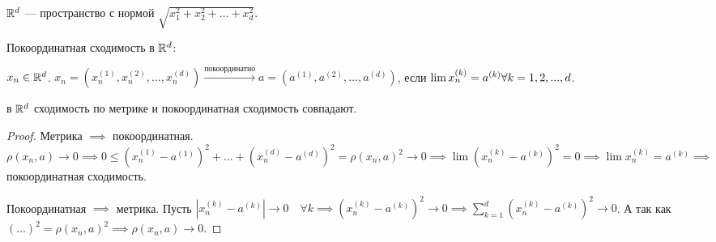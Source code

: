 \begin{definition}
    $\mathbb{R}^d$ --- пространство с нормой  $\sqrt{x_1^2 + x_2^2 + \ldots + x_d^2}$.
\end{definition}
\begin{definition}
    Покоординатная сходимость в $\mathbb{R}^d$:

    $x_n \in \mathbb{R}^d$.  $x_n = (x_n^{(1)}, x_n^{(2)}, \ldots, x_n^{(d)}) \xrightarrow{\text{покоординатно}} a = (a^{(1)}, a^{(2)}, \ldots, a^{(d)})$, если $\lim x_n^{(k)} = a^{(k)}\\ \forall k = 1, 2, ..., d$.
\end{definition}
\begin{theorem}
    в $\mathbb{R}^d$ сходимость по метрике и покоординатная сходимость совпадают.
\end{theorem}
\begin{proof}
    Метрика $\implies$ покоординатная.  $\rho(x_n, a) \to 0 \implies 0 \le (x_n^{(1)} - a^{(1)})^2 + \ldots + (x_n^{(d)} - a^{(d)})^2 = \rho(x_n, a)^2 \to 0 \implies \lim (x_n^{(k)} - a^{(k)})^2 = 0 \implies \lim x_n^{(k)} = a^{(k)} \implies$ покоординатная сходимость.

    Покоординатная $\implies$ метрика. Пусть  $|x_n^{(k)} - a^{(k)}| \to 0 \quad \forall k \implies (x_n^{(k)} - a^{(k)})^2 \to 0 \implies \sum\limits_{k=1}^d (x_n^{(k)} - a^{(k)})^2 \to 0$. А так как $(\ldots)^2 = \rho(x_n, a)^2 \implies \rho(x_n, a) \to 0$.
\end{proof}
